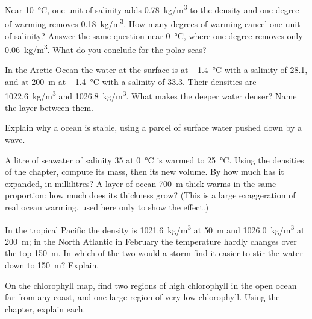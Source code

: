 \begin{exercise}[$\star\star$]\label{exo:g10:layered-ocean:9}
Near \qty{10}{\degreeCelsius}, one unit of salinity adds
\qty{0.78}{kg/m^3} to the density and one degree of warming removes
\qty{0.18}{kg/m^3}. How many degrees of warming cancel one unit of
salinity? Answer the same question near \qty{0}{\degreeCelsius}, where one
degree removes only \qty{0.06}{kg/m^3}. What do you conclude for the polar
seas?
\end{exercise}

\begin{exercise}[$\star\star$]\label{exo:g10:layered-ocean:10}
In the Arctic Ocean the water at the surface is at \qty{-1.4}{\degreeCelsius}
with a salinity of 28.1, and at \qty{200}{m} at \qty{-1.4}{\degreeCelsius}
with a salinity of 33.3. Their densities are \qty{1022.6}{kg/m^3} and
\qty{1026.8}{kg/m^3}. What makes the deeper water denser? Name the layer
between them.
\end{exercise}

\begin{exercise}[$\star\star$]\label{exo:g10:layered-ocean:11}
Explain why a  ocean is stable, using a parcel of surface water
pushed down by a wave.
\end{exercise}

\begin{exercise}[$\star\star\star$]\label{exo:g10:layered-ocean:12}
A litre of seawater of salinity 35 at \qty{0}{\degreeCelsius} is warmed to
\qty{25}{\degreeCelsius}. Using the densities of the chapter, compute its
mass, then its new volume. By how much has it expanded, in millilitres? A
layer of ocean \qty{700}{m} thick warms in the same proportion: how much does
its thickness grow? (This is a large exaggeration of real ocean warming,
used here only to show the effect.)
\end{exercise}

\begin{exercise}[$\star\star\star$]\label{exo:g10:layered-ocean:13}
In the tropical Pacific the density is \qty{1021.6}{kg/m^3} at \qty{50}{m}
and \qty{1026.0}{kg/m^3} at \qty{200}{m}; in the North Atlantic in February
the temperature hardly changes over the top \qty{150}{m}. In which of the two
would a storm find it easier to stir the water down to \qty{150}{m}? Explain.
\end{exercise}

\begin{exercise}[$\star\star\star$]\label{exo:g10:layered-ocean:14}
On the chlorophyll map, find two regions of high chlorophyll in the open
ocean far from any coast, and one large region of very low chlorophyll.
Using the chapter, explain each.
\end{exercise}

